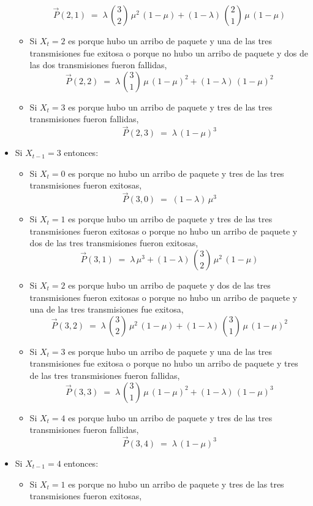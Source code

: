 \documentclass[ a4paper, twoside, 11pt]{article}
\begin{document}
\begin{problem}
\begin{itemize}
\begin{itemize}
\[
\vec{P}(2,1) \; = \; \lambda \, { 3 \choose 2 } \, \mu^2 \, (1-\mu) + (1-\lambda) \, { 2 \choose 1 } \, \mu \, (1-\mu)
\]
\item Si $X_t = 2$ es porque hubo un arribo de paquete y una de las tres transmisiones fue exitosa o porque no hubo un arribo de paquete y dos de las dos transmisiones fueron fallidas, \iec
\[
\vec{P}(2,2) \; = \; \lambda \, { 3 \choose 1 } \, \mu \, (1-\mu)^2 + (1-\lambda) \, (1-\mu)^2
\]
\item Si $X_t = 3$ es porque hubo un arribo de paquete y tres de las tres transmisiones fueron fallidas, \iec
\[
\vec{P}(2,3) \; = \; \lambda \, (1-\mu)^3
\]
\end{itemize}
\item Si $X_{t-1} = 3$ entonces: 
\begin{itemize}
\item Si $X_t = 0$ es porque no hubo un arribo de paquete y tres de las tres transmisiones fueron exitosas, \iec
\[
\vec{P}(3,0) \; = \; (1-\lambda) \, \mu^3
\]
\item Si $X_t = 1$ es porque hubo un arribo de paquete y tres de las tres transmisiones fueron exitosas o porque no hubo un arribo de paquete y dos de las tres transmisiones fueron exitosas, \iec
\[
\vec{P}(3,1) \; = \; \lambda \, \mu^3 + (1-\lambda) \, { 3 \choose 2 } \, \mu^2 \, (1-\mu)
\]
\item Si $X_t = 2$ es porque hubo un arribo de paquete y dos de las tres transmisiones fueron exitosas o porque no hubo un arribo de paquete y una de las tres transmisiones fue exitosa, \iec
\[
\vec{P}(3,2) \; = \; \lambda \, { 3 \choose 2 } \, \mu^2 \, (1-\mu) + (1-\lambda) \, { 3 \choose 1 } \, \mu \, (1-\mu)^2
\]
\item Si $X_t = 3$ es porque hubo un arribo de paquete y una de las tres transmisiones fue exitosa o porque no hubo un arribo de paquete y tres de las tres transmisiones fueron fallidas, \iec
\[
\vec{P}(3,3) \; = \; \lambda \, { 3 \choose 1 } \, \mu \, (1-\mu)^2 + (1-\lambda) \, (1-\mu)^3
\]
\item Si $X_t = 4$ es porque hubo un arribo de paquete y tres de las tres transmisiones fueron fallidas, \iec
\[
\vec{P}(3,4) \; = \; \lambda \, (1-\mu)^3
\]
\end{itemize}
\item Si $X_{t-1} = 4$ entonces: 
\begin{itemize}
\item Si $X_t = 1$ es porque no hubo un arribo de paquete y tres de las tres transmisiones fueron exitosas, \iec

\end{itemize}
\end{itemize}
\end{problem}
\end{document}

